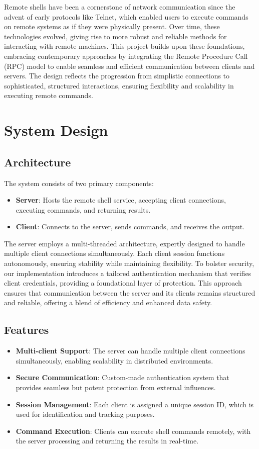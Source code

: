 \documentclass[12pt,a4paper]{report}
\begin{document}
Remote shells have been a cornerstone of network communication since the advent of early protocols like Telnet, which enabled users to execute commands on remote systems as if they were physically present. Over time, these technologies evolved, giving rise to more robust and reliable methods for interacting with remote machines. This project builds upon these foundations, embracing contemporary approaches by integrating the Remote Procedure Call (RPC) model to enable seamless and efficient communication between clients and servers. The design reflects the progression from simplistic connections to sophisticated, structured interactions, ensuring flexibility and scalability in executing remote commands.

\chapter{System Design}
\section{Architecture}
The system consists of two primary components:
\begin{itemize}
    \item \textbf{Server}: Hosts the remote shell service, accepting client connections, executing commands, and returning results.
    \item \textbf{Client}: Connects to the server, sends commands, and receives the output.
\end{itemize}

The server employs a multi-threaded architecture, expertly designed to handle multiple client connections simultaneously. Each client session functions autonomously, ensuring stability while maintaining flexibility. To bolster security, our implementation introduces a tailored authentication mechanism that verifies client credentials, providing a foundational layer of protection. This approach ensures that communication between the server and its clients remains structured and reliable, offering a blend of efficiency and enhanced data safety.

\section{Features}
\begin{itemize}
    \item \textbf{Multi-client Support}: The server can handle multiple client connections simultaneously, enabling scalability in distributed environments.
    \item \textbf{Secure Communication}: Custom-made authentication system that provides seamless but potent protection from external influences.
    \item \textbf{Session Management}: Each client is assigned a unique session ID, which is used for identification and tracking purposes.
    \item \textbf{Command Execution}: Clients can execute shell commands remotely, with the server processing and returning the results in real-time.
\end{itemize}
\end{document}
